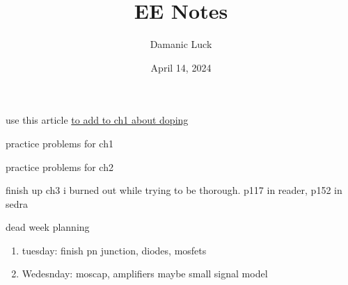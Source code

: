 \documentclass[10pt, openany]{book}
\title{EE Notes}
\author{Damanic Luck}
\date{April 14, 2024}
\begin{document}


\setcounter{chapter}{1}
\tableofcontents
\begin{todo}
    \item use this article \href{http://home.iitj.ac.in/~sptiwari/EE314/Lecture2_Semi_Basics_Junction.pdf}{to add to ch1 about doping}
    \item practice problems for ch1
    \item practice problems for ch2
    \item finish up ch3 i burned out while trying to be thorough. p117 in reader, p152 in sedra
    \item dead week planning
    \begin{enumerate}
        \item tuesday: finish pn junction, diodes, mosfets
        \item Wedesnday: moscap, amplifiers maybe small signal model
    \end{enumerate}
\end{todo}

\newpage


\newpage


\newpage

\end{document}
